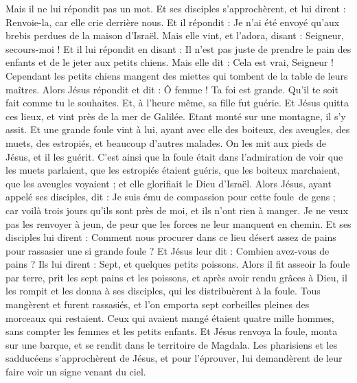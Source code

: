 \begin{multicols}{2}
{Mais il ne lui répondit pas un mot. Et ses disciples s'approchèrent, et lui dirent : Renvoie-la, car elle crie derrière nous.
Et il répondit : Je n’ai été envoyé qu'aux brebis perdues de la maison d'Israël.
Mais elle vint, et l'adora, disant : Seigneur, secours-moi !
Et il lui répondit en disant : Il n’est pas juste de prendre le pain des enfants et de le jeter aux petits chiens.
Mais elle dit : Cela est vrai, Seigneur ! Cependant les petits chiens mangent des miettes qui tombent de la table de leurs maîtres.
Alors Jésus répondit et dit : Ô femme ! Ta foi est grande. Qu'il te soit fait comme tu le souhaites. Et, à l’heure même, sa fille fut guérie.
Et Jésus quitta ces lieux, et vint près de la mer de Galilée. Etant monté sur une montagne, il s’y assit.
Et une grande foule vint à lui, ayant avec elle des boiteux, des aveugles, des muets, des estropiés, et beaucoup d’autres malades. On les mit aux pieds de Jésus, et il les guérit.
C’est ainsi que la foule était dans l’admiration de voir que les muets parlaient, que les estropiés étaient guéris, que les boiteux marchaient, que les aveugles voyaient ; et elle glorifiait le Dieu d'Israël.
Alors Jésus, ayant appelé ses disciples, dit : Je suis ému de compassion pour cette foule de gens ; car voilà trois jours qu'ils sont près de moi, et ils n'ont rien à manger. Je ne veux pas les renvoyer à jeun, de peur que les forces ne leur manquent en chemin.
Et ses disciples lui dirent : Comment nous procurer dans ce lieu désert assez de pains pour rassasier une si grande foule ?
Et Jésus leur dit : Combien avez-vous de pains ? Ils lui dirent : Sept, et quelques petits poissons.
Alors il fit asseoir la foule par terre,
prit les sept pains et les poissons, et après avoir rendu grâces à Dieu, il les rompit et les donna à ses disciples, qui les distribuèrent à la foule.
Tous mangèrent et furent rassasiés, et l’on emporta sept corbeilles pleines des morceaux qui restaient.
Ceux qui avaient mangé étaient quatre mille hommes, sans compter les femmes et les petits enfants.
Et Jésus renvoya la foule, monta sur une barque, et se rendit dans le territoire de Magdala.
\VerseOne{}Les pharisiens et les sadducéens s’approchèrent de Jésus, et pour l'éprouver, lui demandèrent de leur faire voir un signe venant du ciel.
}
\end{multicols}
